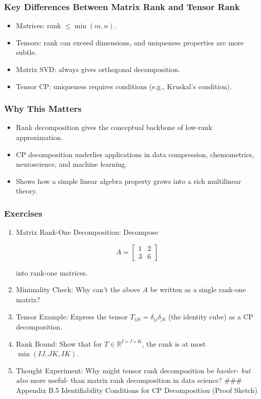\documentclass[
  letterpaper,
  DIV=11,
  numbers=noendperiod]{scrreprt}
\providecommand{\tightlist}{%
  \setlength{\itemsep}{0pt}\setlength{\parskip}{0pt}}
\begin{document}
\subsubsection{Key Differences Between Matrix Rank and Tensor
Rank}\label{key-differences-between-matrix-rank-and-tensor-rank}

\begin{itemize}
\tightlist
\item
  Matrices: rank \(\leq \min(m,n)\).
\item
  Tensors: rank can exceed dimensions, and uniqueness properties are
  more subtle.
\item
  Matrix SVD: always gives orthogonal decomposition.
\item
  Tensor CP: uniqueness requires conditions (e.g., Kruskal's condition).
\end{itemize}

\subsubsection{Why This Matters}\label{why-this-matters-63}

\begin{itemize}
\tightlist
\item
  Rank decomposition gives the conceptual backbone of low-rank
  approximation.
\item
  CP decomposition underlies applications in data compression,
  chemometrics, neuroscience, and machine learning.
\item
  Shows how a simple linear algebra property grows into a rich
  multilinear theory.
\end{itemize}

\subsubsection{Exercises}\label{exercises-78}

\begin{enumerate}
\def\labelenumi{\arabic{enumi}.}
\item
  Matrix Rank-One Decomposition: Decompose

  \[
  A = \begin{bmatrix} 1 & 2 \\ 3 & 6 \end{bmatrix}
  \]

  into rank-one matrices.
\item
  Minimality Check: Why can't the above \(A\) be written as a single
  rank-one matrix?
\item
  Tensor Example: Express the tensor
  \(T_{ijk} = \delta_{ij}\delta_{jk}\) (the identity cube) as a CP
  decomposition.
\item
  Rank Bound: Show that for \(T \in \mathbb{R}^{I \times J \times K}\),
  the rank is at most \(\min(IJ, JK, IK)\).
\item
  Thought Experiment: Why might tensor rank decomposition be
  \emph{harder- but also }more useful- than matrix rank decomposition in
  data science? \#\#\# Appendix B.5 Identifiability Conditions for CP
  Decomposition (Proof Sketch)
\end{enumerate}
\end{document}
